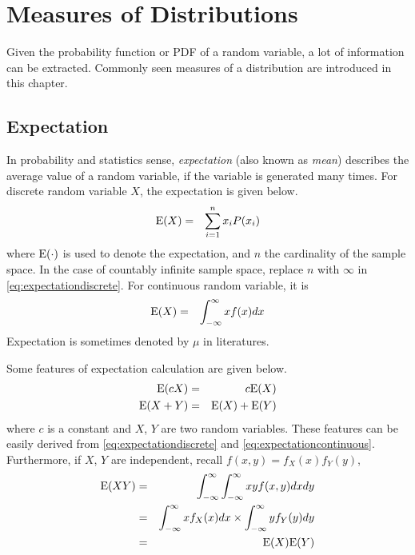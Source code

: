 \chapter{Measures of Distributions} \label{ch:measuresdistribution}

Given the probability function or PDF of a random variable, a lot of information can be extracted. Commonly seen measures of a distribution are introduced in this chapter.

\section{Expectation}

In probability and statistics sense, \textit{expectation} (also known as \textit{mean}) describes the average value of a random variable, if the variable is generated many times. For discrete random variable $X$, the expectation is given below.
\begin{eqnarray}
  \textup{E}(X) &=& \sum_{i=1}^{n}x_iP(x_i) \label{eq:expectationdiscrete}
\end{eqnarray}
where $\textup{E}(\cdot)$ is used to denote the expectation, and $n$ the cardinality of the sample space. In the case of countably infinite sample space, replace $n$ with $\infty$ in \eqref{eq:expectationdiscrete}. For continuous random variable, it is
\begin{eqnarray}
  \textup{E}(X) &=& \int_{-\infty}^{\infty}xf(x)dx \label{eq:expectationcontinuous}
\end{eqnarray}
Expectation is sometimes denoted by $\mu$ in literatures.

Some features of expectation calculation are given below.
\begin{eqnarray}
  \textup{E}(cX) &=& c\textup{E}(X) \nonumber \\
  \textup{E}(X+Y) &=& \textup{E}(X) + \textup{E}(Y) \nonumber
\end{eqnarray}
where $c$ is a constant and $X$, $Y$ are two random variables. These features can be easily derived from \eqref{eq:expectationdiscrete} and \eqref{eq:expectationcontinuous}. Furthermore, if $X$, $Y$ are independent, recall $f(x,y) = f_X(x)f_Y(y)$,
\begin{eqnarray}
  \textup{E}(XY) &=& \int_{-\infty}^{\infty}\int_{-\infty}^{\infty} xyf(x, y)dxdy \nonumber \\
  &=& \int_{-\infty}^{\infty}xf_X(x)dx \times \int_{-\infty}^{\infty}yf_Y(y)dy \nonumber \\
  &=& \textup{E}(X)\textup{E}(Y) \nonumber
\end{eqnarray}

